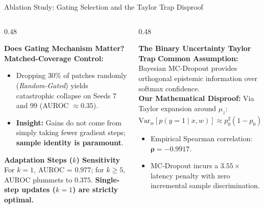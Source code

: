 \documentclass[aspectratio=169,10pt]{beamer}
\begin{document}
\begin{frame}{Ablation Study: Gating Selection and the Taylor Trap Disproof}
    \begin{columns}[T]
        \begin{column}{0.48\textwidth}
            \begin{block}{\textbf{Does Gating Mechanism Matter?}}
                \small
                \textbf{Matched-Coverage Control:}
                \begin{itemize}
                    \item Dropping 30\% of patches randomly (\textit{Random-Gated}) yields catastrophic collapse on Seeds 7 and 99 (AUROC $\approx 0.35$).
                    \item \textbf{Insight:} Gains do not come from simply taking fewer gradient steps; \textbf{sample identity is paramount}.
                \end{itemize}
            \end{block}
            \vspace{0.1cm}
            \begin{block}{\textbf{Adaptation Steps ($k$) Sensitivity}}
                \small
                For $k=1$, AUROC = $0.977$; for $k \ge 5$, AUROC plummets to $0.375$. \textbf{Single-step updates ($k=1$) are strictly optimal.}
            \end{block}
        \end{column}
        \begin{column}{0.48\textwidth}
            \begin{alertblock}{\textbf{The Binary Uncertainty Taylor Trap}}
                \small
                \textbf{Common Assumption:} Bayesian MC-Dropout provides orthogonal epistemic information over softmax confidence.
                \vspace{0.1cm}\\
                \textbf{Our Mathematical Disproof:}
                Via Taylor expansion around $\mu_z$:
                \begin{equation*}
                    \text{Var}_{w}[p(y=1 \mid x, w)] \approx p_0^2 (1 - p_0)^2 \sigma_z^2
                \end{equation*}
                \begin{itemize}
                    \item Empirical Spearman correlation: \alert{$\mathbf{\rho = -0.9917}$}.
                    \item MC-Dropout incurs a \alert{$\mathbf{3.55\times}$ latency penalty} with zero incremental sample discrimination.
                \end{itemize}
            \end{alertblock}
        \end{column}
    \end{columns}
\end{frame}
\end{document}
